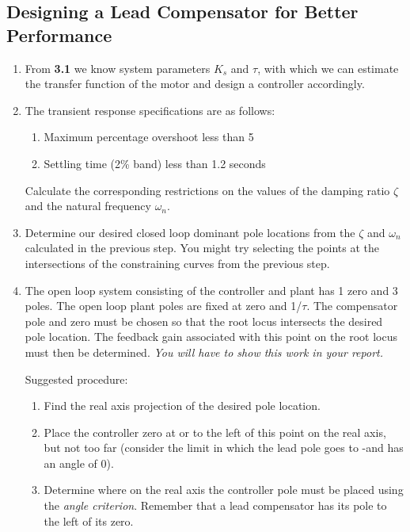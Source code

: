 \documentclass[11pt,a4paper]{article}
\begin{document}
\subsection{Designing a Lead Compensator for Better Performance}
\begin{enumerate}


\item From \textbf{3.1} we know system parameters $K_{s}$ and $\tau$, with which we can estimate the transfer function of the motor and design a controller accordingly.

\item The transient response specifications are as follows:
\begin{enumerate}
\item Maximum percentage overshoot less than 5%
\item Settling time (2\% band) less than 1.2 seconds
\end{enumerate}

Calculate the corresponding restrictions on the values of the damping ratio $\zeta$ and the natural frequency $\omega_{n}$.


\item Determine our desired closed loop dominant pole locations from the $\zeta$ and $\omega_{n}$ calculated in the previous step. You might try selecting the points at the intersections of the constraining curves from the previous step.

\item  The open loop system consisting of the controller and plant has 1 zero and 3 poles. The open loop plant poles are fixed at zero and 1/$\tau$. The compensator pole and zero must be chosen so that the root locus intersects the desired pole location. The feedback gain associated with this point on the root locus must then be determined. \textit{You will have to show this work in your report.}

Suggested procedure:
\begin{enumerate}

\item Find the real axis projection of the desired pole location.

\item \label{step:zeropos} Place the controller zero at or to the left of this point on the real axis, but not too far (consider the limit in which the lead pole goes to -\infty and has an angle of 0).

\item Determine where on the real axis the controller pole must be placed using the \textit{angle criterion}. Remember that a lead compensator has its pole to the left of its zero.


\end{enumerate}
\end{enumerate}
\end{document}
